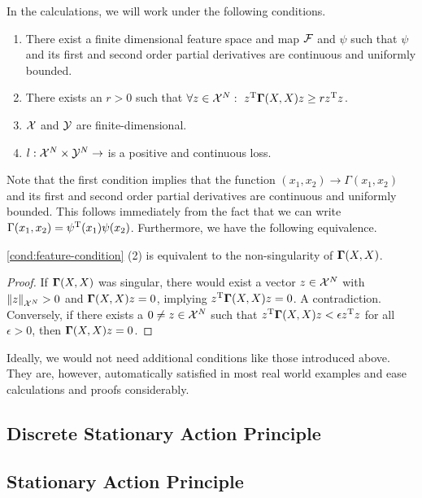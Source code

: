 In the calculations, we will work under the following conditions.
\begin{condition}
	\label{cond:feature-condition}\mbox{}
	\vspace*{-\parsep}
	\vspace*{-\baselineskip}
	\begin{enumerate}
		\item There exist a finite dimensional feature space and map $\mathcal{F}$ and $\psi$ such that $\psi$ and its first and second order partial derivatives are continuous and uniformly bounded.
		\item There exists an $r > 0$ such that $\forall z \in \mathcal{X}^N:~z^{\mathrm{T}} \mathbf{\Gamma}(X, X) z \geq r z^{\mathrm{T}} z$.
		\item $\mathcal{X}$ and $\mathcal{Y}$ are finite-dimensional.
		\item $l: \mathcal{X}^N \times \mathcal{Y}^N \rightarrow$ is a positive and continuous loss.
	\end{enumerate}
\end{condition}
Note that the first condition implies that the function $(x_1, x_2) \rightarrow \Gamma(x_1, x_2)$ and its first and second order partial derivatives are continuous and uniformly bounded.
This follows immediately from the fact that we can write $\Gamma(x_1, x_2) = \psi^{\mathrm{T}}(x_1)\psi(x_2)$.
Furthermore, we have the following equivalence.
\begin{lemma}
	\cref{cond:feature-condition} (2) is equivalent to the non-singularity of $\mathbf{\Gamma}(X, X)$.
\end{lemma}
\begin{proof}
	If $\mathbf{\Gamma}(X, X)$ was singular, there would exist a vector $z \in \mathcal{X}^N$ with $\norm{z}_{\mathcal{X}^N} > 0$ and $\mathbf{\Gamma}(X, X) z = 0$, implying $z^{\mathrm{T}} \mathbf{\Gamma}(X, X)z = 0$. 
	A contradiction.
	Conversely, if there exists a $0 \neq z \in \mathcal{X}^N$ such that $z^{\mathrm{T}} \mathbf{\Gamma}(X, X) z < \epsilon z^{\mathrm{T}} z$ for all $\epsilon > 0$, then $\mathbf{\Gamma}(X, X) z = 0$.
\end{proof}
Ideally, we would not need additional conditions like those introduced above.
They are, however, automatically satisfied in most real world examples and ease calculations and proofs considerably.

\subsection{Discrete Stationary Action Principle}



\subsection{Stationary Action Principle}

